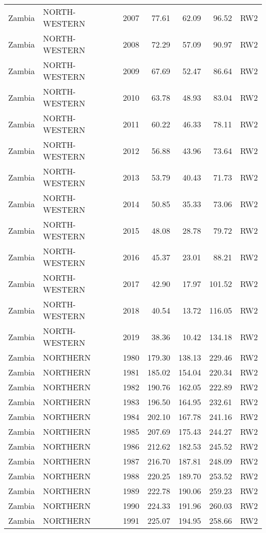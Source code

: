 \begin{longtable}{lllrrrl}
  Zambia & NORTH-WESTERN & 2007 & 77.61 & 62.09 & 96.52 & RW2 \\ 
  Zambia & NORTH-WESTERN & 2008 & 72.29 & 57.09 & 90.97 & RW2 \\ 
  Zambia & NORTH-WESTERN & 2009 & 67.69 & 52.47 & 86.64 & RW2 \\ 
  Zambia & NORTH-WESTERN & 2010 & 63.78 & 48.93 & 83.04 & RW2 \\ 
  Zambia & NORTH-WESTERN & 2011 & 60.22 & 46.33 & 78.11 & RW2 \\ 
  Zambia & NORTH-WESTERN & 2012 & 56.88 & 43.96 & 73.64 & RW2 \\ 
  Zambia & NORTH-WESTERN & 2013 & 53.79 & 40.43 & 71.73 & RW2 \\ 
  Zambia & NORTH-WESTERN & 2014 & 50.85 & 35.33 & 73.06 & RW2 \\ 
  Zambia & NORTH-WESTERN & 2015 & 48.08 & 28.78 & 79.72 & RW2 \\ 
  Zambia & NORTH-WESTERN & 2016 & 45.37 & 23.01 & 88.21 & RW2 \\ 
  Zambia & NORTH-WESTERN & 2017 & 42.90 & 17.97 & 101.52 & RW2 \\ 
  Zambia & NORTH-WESTERN & 2018 & 40.54 & 13.72 & 116.05 & RW2 \\ 
  Zambia & NORTH-WESTERN & 2019 & 38.36 & 10.42 & 134.18 & RW2 \\ 
  Zambia & NORTHERN & 1980 & 179.30 & 138.13 & 229.46 & RW2 \\ 
  Zambia & NORTHERN & 1981 & 185.02 & 154.04 & 220.34 & RW2 \\ 
  Zambia & NORTHERN & 1982 & 190.76 & 162.05 & 222.89 & RW2 \\ 
  Zambia & NORTHERN & 1983 & 196.50 & 164.95 & 232.61 & RW2 \\ 
  Zambia & NORTHERN & 1984 & 202.10 & 167.78 & 241.16 & RW2 \\ 
  Zambia & NORTHERN & 1985 & 207.69 & 175.43 & 244.27 & RW2 \\ 
  Zambia & NORTHERN & 1986 & 212.62 & 182.53 & 245.52 & RW2 \\ 
  Zambia & NORTHERN & 1987 & 216.70 & 187.81 & 248.09 & RW2 \\ 
  Zambia & NORTHERN & 1988 & 220.25 & 189.70 & 253.52 & RW2 \\ 
  Zambia & NORTHERN & 1989 & 222.78 & 190.06 & 259.23 & RW2 \\ 
  Zambia & NORTHERN & 1990 & 224.33 & 191.96 & 260.03 & RW2 \\ 
  Zambia & NORTHERN & 1991 & 225.07 & 194.95 & 258.66 & RW2 \\ 

\end{longtable}
